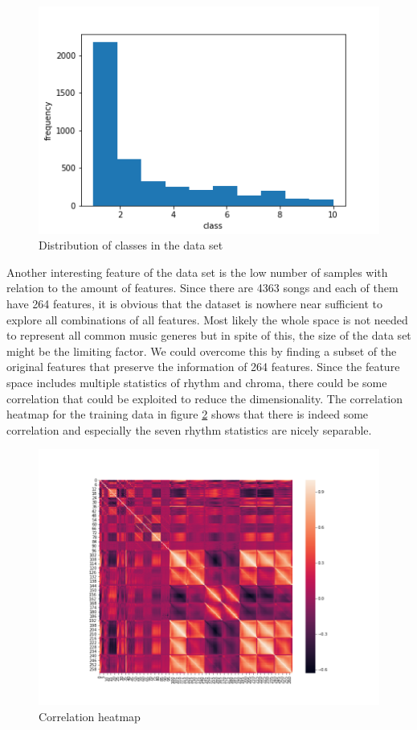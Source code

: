 \documentclass[fleqn,10pt]{SelfArx} %
\begin{document}
\begin{figure}[H]
  \includegraphics[width=\linewidth]{class-dist-hist.png}
  \caption{Distribution of classes in the data set}
  \label{fig:dist-hist}
\end{figure}

Another interesting feature of the data set is the low number of samples with
relation to the amount of features. Since there are 4363 songs and each of them
have 264 features, it is obvious that the dataset is nowhere near sufficient to
explore all combinations of all features. Most likely the whole space is not
needed to represent all common music generes but in spite of this, the size of
the data set might be the limiting factor. We could overcome this by finding a
subset of the original features that preserve the information of 264 features.
Since the feature space includes multiple statistics of rhythm and chroma, there
could be some correlation that could be exploited to reduce the dimensionality.
The correlation heatmap for the training data in figure \ref{fig:heatmap} shows
that there is indeed some correlation and especially the seven rhythm statistics
are nicely separable.

\begin{figure}[H]
  \centering
  \includegraphics[width=\linewidth]{heatmap.png}
  \caption{Correlation heatmap}
  \label{fig:heatmap}
\end{figure}
\end{document}
